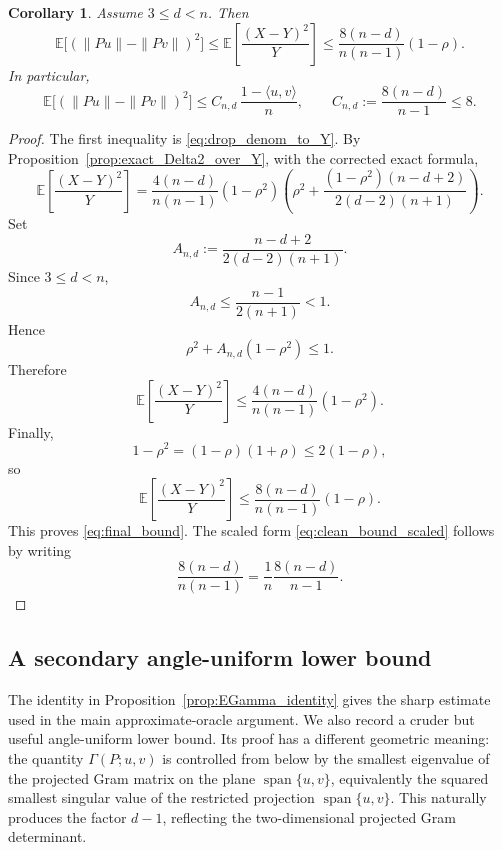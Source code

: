 \documentclass{article}
\newtheorem{corollary}{Corollary}
\begin{document}
\begin{corollary}
\label{cor:clean_bound}
Assume \(3\le d<n\). Then
\begin{equation}
\mathbb E\big[(\|Pu\|-\|Pv\|)^2\big]
\le
\mathbb E\!\left[\frac{(X-Y)^2}{Y}\right]
\le
\frac{8(n-d)}{n(n-1)}(1-\rho).
\label{eq:final_bound}
\end{equation}
In particular,
\begin{equation}
\mathbb E\big[(\|Pu\|-\|Pv\|)^2\big]
\le
C_{n,d}\,\frac{1-\langle u,v\rangle}{n},
\qquad
C_{n,d}:=\frac{8(n-d)}{n-1}\le 8.
\label{eq:clean_bound_scaled}
\end{equation}
\end{corollary}

\begin{proof}
The first inequality is \eqref{eq:drop_denom_to_Y}. By
Proposition~\ref{prop:exact_Delta2_over_Y}, with the corrected exact formula,
\[
\mathbb E\!\left[\frac{(X-Y)^2}{Y}\right]
=
\frac{4(n-d)}{n(n-1)}(1-\rho^2)
\left(
\rho^2+
\frac{(1-\rho^2)(n-d+2)}{2(d-2)(n+1)}
\right).
\]
Set
\[
A_{n,d}:=\frac{n-d+2}{2(d-2)(n+1)}.
\]
Since \(3\le d<n\),
\[
A_{n,d}\le \frac{n-1}{2(n+1)}<1.
\]
Hence
\[
\rho^2+A_{n,d}(1-\rho^2)\le 1.
\]
Therefore
\[
\mathbb E\!\left[\frac{(X-Y)^2}{Y}\right]
\le
\frac{4(n-d)}{n(n-1)}(1-\rho^2).
\]
Finally,
\[
1-\rho^2=(1-\rho)(1+\rho)\le 2(1-\rho),
\]
so
\[
\mathbb E\!\left[\frac{(X-Y)^2}{Y}\right]
\le
\frac{8(n-d)}{n(n-1)}(1-\rho).
\]
This proves \eqref{eq:final_bound}. The scaled form
\eqref{eq:clean_bound_scaled} follows by writing
\[
\frac{8(n-d)}{n(n-1)}
=
\frac{1}{n}\frac{8(n-d)}{n-1}.
\]
\end{proof}

\subsection{A secondary angle-uniform lower bound}

The identity in Proposition~\ref{prop:EGamma_identity} gives the sharp estimate
used in the main approximate-oracle argument. We also record a cruder but useful
angle-uniform lower bound. Its proof has a different geometric meaning: the
quantity \(\Gamma(P;u,v)\) is controlled from below by 
the smallest eigenvalue of the projected Gram matrix on the plane
\(\operatorname{span}\{u,v\}\), equivalently the squared smallest singular
value of the restricted projection \(\operatorname{span}\{u,v\}\).
This naturally produces the factor \(d-1\), reflecting the two-dimensional
projected Gram determinant.
\end{document}
